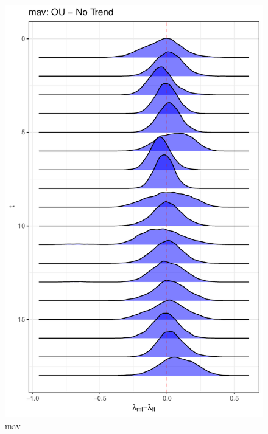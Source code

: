 \documentclass[
  12pt,
]{article}
\begin{document}
\begin{figure}

{\centering \includegraphics[width=0.9\linewidth]{../Figures/mav/lambda_diff} 

}

\caption{mav}\label{fig:unnamed-chunk-15}
\end{figure}
\end{document}
